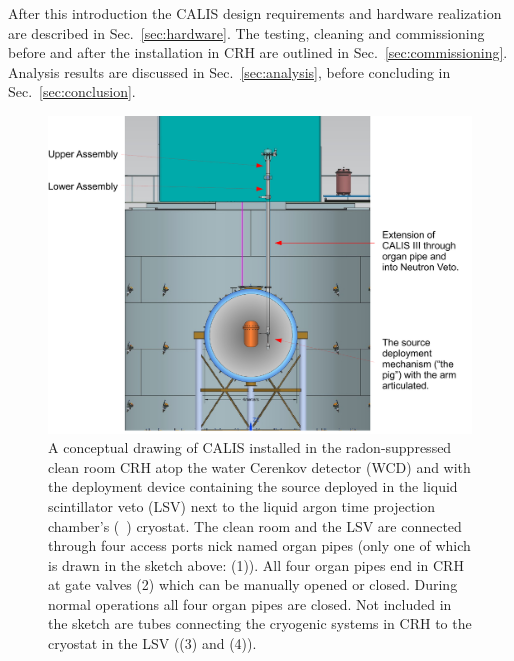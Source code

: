 After this introduction the CALIS design requirements and hardware realization are described in Sec.~\ref{sec:hardware}. The testing, cleaning and commissioning before and after the installation in CRH are outlined in Sec.~\ref{sec:commissioning}. Analysis results are discussed in Sec.~\ref{sec:analysis}, before concluding in Sec.~\ref{sec:conclusion}.

\begin{figure}[htbp]
 \centering
\includegraphics[width=\textwidth]{Figures/wholeAssembly_insideDetectors}
\caption{A conceptual drawing of CALIS installed in the radon-suppressed clean room CRH atop the water Cerenkov detector (WCD) and with the deployment device containing the source  %
deployed in the liquid scintillator veto (LSV) next to the liquid argon time projection chamber's (\lar\ \tpc) cryostat. The clean room and the LSV are connected through four %
access ports nick named organ pipes (only one of which is drawn in the sketch above: (1)). All four organ pipes end in CRH at gate valves (2) which can be manually opened or closed. During normal operations all four organ pipes are closed. Not included in the sketch are tubes connecting the cryogenic systems in CRH to the cryostat in the LSV ((3) and (4)).\label{fig:wholeAssembly_insideDetectors}}
\end{figure}

